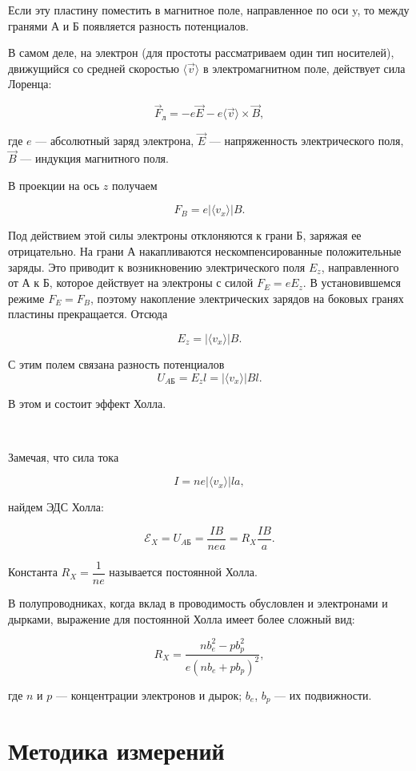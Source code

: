 \documentclass[a4paper, 12pt]{article}
\begin{document}
	Если эту пластину поместить в магнитное поле, направленное по оси y, то между гранями А и Б появляется разность потенциалов. 
	
	В самом деле, на электрон (для простоты рассматриваем один тип носителей), движущийся со средней скоростью $\langle \vec{v} \rangle$ в электромагнитном поле, действует сила Лоренца:
	
	$$\vec{F}_{л} = -e\vec{E}-e \langle \vec{v} \rangle \times \vec{B},$$
	
	где $e$ --- абсолютный заряд электрона, $\vec{E}$ --- напряженность электрического поля, $\vec{B}$ --- индукция магнитного поля.
	
	В проекции на ось $z$ получаем
	
	$$ F_{B}=e | \langle {v_{x}} \rangle | B.$$
	
	Под действием этой силы электроны отклоняются к грани Б, заряжая ее отрицательно. На грани А накапливаются нескомпенсированные положительные заряды. Это приводит к возникновению электрического поля $E_{z}$, направленного от А к Б, которое действует на электроны с силой $F_{E}=eE_{z}$. В установившемся режиме $F_{E}=F_{B}$, поэтому накопление электрических зарядов на боковых гранях пластины прекращается. Отсюда
	
	$$ E_{z}=| \langle {v_{x}} \rangle | B.$$
	
	С этим полем связана разность потенциалов $$U_{AБ}=E_{z}l=| \langle {v_{x}} \rangle | Bl.$$
	
	В этом и состоит эффект Холла.
	
	\
	
	Замечая, что сила тока
	
	$$ I=ne| \langle {v_{x}} \rangle |la,$$
	
	найдем ЭДС Холла:
	
\begin{equation}\label{Rx}
	\mathscr{E}_{X}=U_{AБ}=\dfrac{IB}{nea}=R_{X}\dfrac{IB}{a}.
\end{equation}
	
	Константа $R_{X}=\dfrac{1}{ne}$ называется постоянной Холла.
	
	В полупроводниках, когда вклад в проводимость обусловлен и электронами и дырками, выражение для постоянной Холла имеет более сложный вид:
	
	$$R_{X}=\dfrac{nb^{2}_{e}-pb^{2}_{p}}{e(nb_{e}+pb_{p})^{2}},$$
	
	где $n$ и $p$ --- концентрации электронов и дырок; $b_{e}$, $b_{p}$ --- их подвижности.

\section{Методика измерений}
\end{document}
